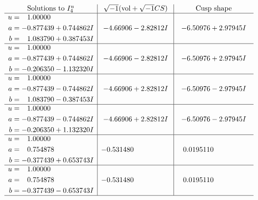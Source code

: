 \documentclass[1p]{elsarticle_modified}
\theoremstyle{definition}
\newcommand{\I}{\sqrt{-1}}
\begin{document}
$$\begin{array}{c|c|c}  
\text{Solutions to }I^u_{4}& \I (\text{vol} + \sqrt{-1}CS) & \text{Cusp shape}\\
 \hline 
\begin{aligned}
u &= \phantom{-}1.00000\phantom{ +0.000000I} \\
a &= -0.877439 + 0.744862 I \\
b &= \phantom{-}1.083790 + 0.387453 I\end{aligned}
 & -4.66906 - 2.82812 I & -6.50976 + 2.97945 I \\ \hline\begin{aligned}
u &= \phantom{-}1.00000\phantom{ +0.000000I} \\
a &= -0.877439 + 0.744862 I \\
b &= -0.206350 - 1.132320 I\end{aligned}
 & -4.66906 - 2.82812 I & -6.50976 + 2.97945 I \\ \hline\begin{aligned}
u &= \phantom{-}1.00000\phantom{ +0.000000I} \\
a &= -0.877439 - 0.744862 I \\
b &= \phantom{-}1.083790 - 0.387453 I\end{aligned}
 & -4.66906 + 2.82812 I & -6.50976 - 2.97945 I \\ \hline\begin{aligned}
u &= \phantom{-}1.00000\phantom{ +0.000000I} \\
a &= -0.877439 - 0.744862 I \\
b &= -0.206350 + 1.132320 I\end{aligned}
 & -4.66906 + 2.82812 I & -6.50976 - 2.97945 I \\ \hline\begin{aligned}
u &= \phantom{-}1.00000\phantom{ +0.000000I} \\
a &= \phantom{-}0.754878\phantom{ +0.000000I} \\
b &= -0.377439 + 0.653743 I\end{aligned}
 & -0.531480\phantom{ +0.000000I} & \phantom{-}0.0195110\phantom{ +0.000000I} \\ \hline\begin{aligned}
u &= \phantom{-}1.00000\phantom{ +0.000000I} \\
a &= \phantom{-}0.754878\phantom{ +0.000000I} \\
b &= -0.377439 - 0.653743 I\end{aligned}
 & -0.531480\phantom{ +0.000000I} & \phantom{-}0.0195110\phantom{ +0.000000I}\\
 \hline 
 \end{array}$$\newpage
\end{document}
